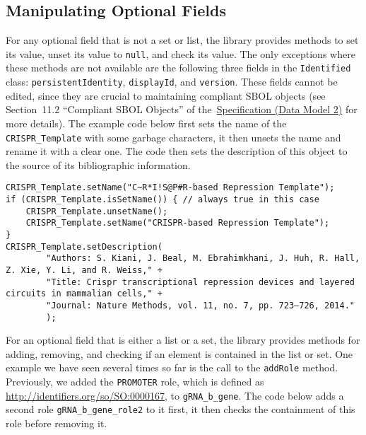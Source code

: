 \subsection*{Manipulating Optional Fields}
For any optional field that is not a set or list, the library provides methods to set its value, unset its value to \lstinline+null+, and check its value. The only exceptions where these methods are not available are the following three fields in the \lstinline+Identified+ class: \lstinline+persistentIdentity+, \lstinline+displayId+, and
\lstinline+version+.  These fields cannot be edited, since they are crucial to maintaining
compliant SBOL objects (see Section~11.2 ``Compliant SBOL Objects'' of the~\href{http://sbolstandard.org/downloads/specification-data-model-2-0/}{Specification
  (Data Model 2)} for more details).  The example code below first sets the name of the \lstinline+CRISPR_Template+  with some garbage characters, it then unsets the name and rename it with a clear one. The code then sets the description of this object to the source of its bibliographic information. 

\vspace{\abovedisplayskip}
\begin{minipage}{0.95\textwidth} 
\begin{lstlisting}
CRISPR_Template.setName("C~R*I!S@P#R-based Repression Template");
if (CRISPR_Template.isSetName()) { // always true in this case
	CRISPR_Template.unsetName();
	CRISPR_Template.setName("CRISPR-based Repression Template");
}
CRISPR_Template.setDescription(
        "Authors: S. Kiani, J. Beal, M. Ebrahimkhani, J. Huh, R. Hall, Z. Xie, Y. Li, and R. Weiss," + 
        "Title: Crispr transcriptional repression devices and layered circuits in mammalian cells," + 
        "Journal: Nature Methods, vol. 11, no. 7, pp. 723–726, 2014."
        );
\end{lstlisting}
\end{minipage}

For an optional field that is either a list or a set, the library provides methods for adding, removing, and checking if an element is contained in the list or set. One example we have seen several times so far is the call to the \lstinline+addRole+ method. Previously, we added the \lstinline+PROMOTER+ role, which is defined as \url{http://identifiers.org/so/SO:0000167}, to \lstinline+gRNA_b_gene+. The code below adds a second role \lstinline+gRNA_b_gene_role2+ to it first, it then checks the containment of this role before removing it. 

